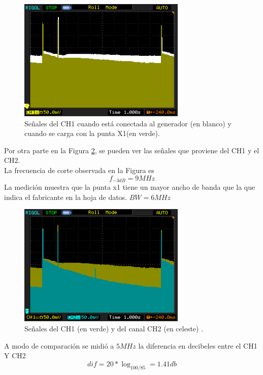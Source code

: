 \documentclass[a4paper,10pt]{article}
\begin{document}
		\begin{figure}[!htb]
			\centering
			\includegraphics[width=8cm]
			{Imagenes/Mediciones instrumentos/NewFile4.png}
			\caption{Se\~nales del CH1 cuando est\'a conectada al generador 
			(en blanco) y cuando se carga con la punta X1(en verde).} 
			\label{img003}
		\end{figure}
		
		\indent Por otra parte en la Figura \ref{img002}, se pueden ver las 
		se\~nales que proviene del CH1 y el CH2. \\
		\indent La frecuencia de corte observada en la Figura es 
		$$f_{-3dB}=9MHz$$
		\indent La medición muestra que la punta x1 tiene un mayor ancho de 
		banda que la que indica el fabricante en la hoja de datos.
		$BW = 6 MHz$
		\begin{figure}[!htb]
			\centering
			\includegraphics[width=8cm]
			{Imagenes/Mediciones instrumentos/NewFile3.png}
			\caption{Se\~nales del CH1 (en verde) y del canal CH2 (en celeste)
			.} \label{img002}
		\end{figure}						
	
		\indent A modo de comparación se midió a $5 MHz$ la diferencia en 
		decibeles entre el CH1 Y CH2 $$dif = 20*\log_{100/85}  = 1.41db $$
\end{document}
